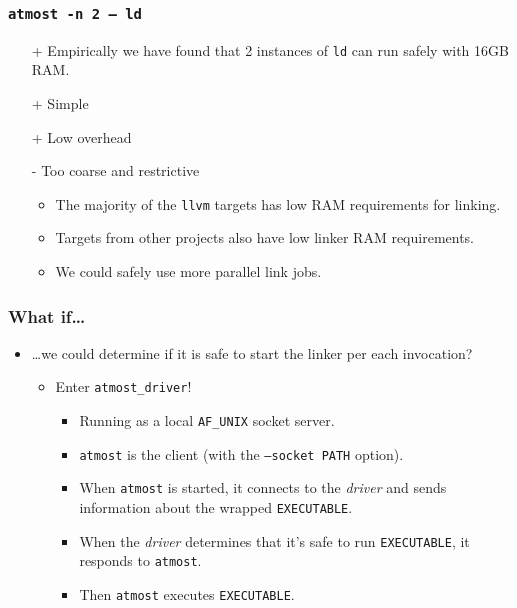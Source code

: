 \documentclass[compress,table,xcolor=table]{beamer}
\newcommand{\shelltext}[1]{\texttt{\colorbox{light-gray}{#1}}}
\begin{document}
\begin{frame}
  \frametitle{\shelltext{atmost -n 2 -- ld}}
  \begin{itemize}
  \Large
  \item [+] Empirically we have found that 2 instances of \shelltext{ld} can run
    safely with 16GB RAM.
  \item [+] Simple
  \item [+] Low overhead
  \item [-] Too coarse and restrictive
    \begin{itemize}
      \large
      \item The majority of the \shelltext{llvm} targets has low RAM requirements for linking.
      \item Targets from other projects also have low linker RAM requirements.
      \item We could safely use {\Large more parallel link jobs}.
    \end{itemize}
  \end{itemize}
\end{frame}
\begin{frame}
  \frametitle{What if\dots}
  \begin{itemize}
    \large
  \item \dots we could {\LARGE determine} if it is safe to start the linker {\LARGE per each invocation}?
    \begin{itemize}
      \LARGE
      \item Enter \shelltext{atmost\_driver}!
      \begin{itemize}
        \large
        \item Running as a local \shelltext{AF\_UNIX} socket server.
        \item \shelltext{atmost} is the client (with the \shelltext{--socket PATH} option).
        \item When \shelltext{atmost} is started, it connects to the {\em driver} and sends information about the wrapped \shelltext{EXECUTABLE}.
        \item When the {\em driver} determines that it's safe to run \shelltext{EXECUTABLE}, it responds to \shelltext{atmost}.
        \item Then \shelltext{atmost} executes \shelltext{EXECUTABLE}.
      \end{itemize}
    \end{itemize}
  \end{itemize}
\end{frame}
\end{document}
